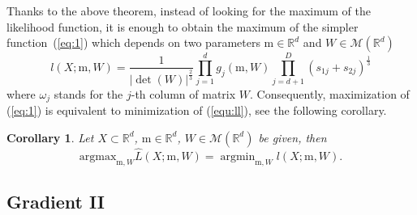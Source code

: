 \documentclass[12pt]{article}
\def\R{\mathbb{R}}
\def\w{\omega}
\def\m{\mathrm{m}}
\def\M{\mathcal{M}}
\DeclareMathOperator*{\argmin}{argmin}
\newtheorem{corollary}{Corollary}[section]
\theoremstyle{definition}
\begin{document}
Thanks to the above theorem, instead of looking for the maximum of the likelihood function, it is enough to obtain the maximum of the simpler function~(\ref{eq:1}) which depends on two parameters $\m \in \R^d$ and $W \in \M(\R^d)$
\begin{equation}\label{equII:ll}
{l}(X;\m,W) = \frac{1}{|\det(W)|^{\frac{2}{3}}} \prod_{j=1}^{d} {g}_{j}(\m,W) \prod_{j=d+1}^{D} (s_{1j} + s_{2j})^{\frac{1}{3}}
\end{equation}
where $\w_{j}$ stands for the $j$-th column of matrix $W$. 
Consequently, maximization of (\ref{eq:1}) is equivalent to minimization of  (\ref{equ:ll}), see the following corollary.

\begin{corollary}\label{IIc2}
Let $X \subset \R^d$, $\m \in \R^d$, $W \in \M(\R^d)$ be given, then
$$
 \text{argmax}_{\m,W} \hat{L}(X;\m,W) =  \argmin_{\m,W} {l}(X;\m,W).
$$
\end{corollary}
%


\subsection{Gradient II}
\end{document}

